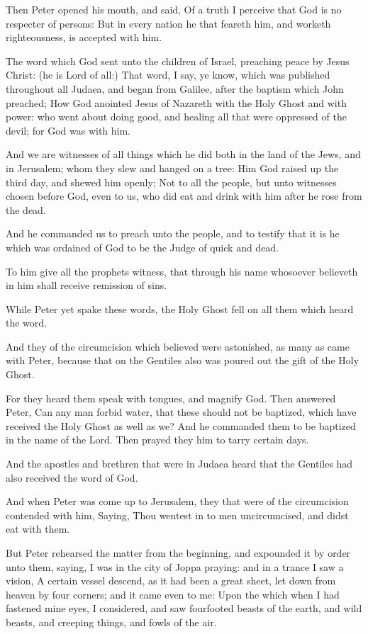 \Verse Then Peter opened his mouth, and said, Of a truth I perceive that God is no respecter of persons: \Verse But in every nation he that feareth him, and worketh righteousness, is accepted with him.

\Verse The word which God sent unto the children of Israel, preaching peace by Jesus Christ: (he is Lord of all:) \Verse That word, I say, ye know, which was published throughout all Judaea, and began from Galilee, after the baptism which John preached; \Verse How God anointed Jesus of Nazareth with the Holy Ghost and with power: who went about doing good, and healing all that were oppressed of the devil; for God was with him.

\Verse And we are witnesses of all things which he did both in the land of the Jews, and in Jerusalem; whom they slew and hanged on a tree: \Verse Him God raised up the third day, and shewed him openly; \Verse Not to all the people, but unto witnesses chosen before God, even to us, who did eat and drink with him after he rose from the dead.

\Verse And he commanded us to preach unto the people, and to testify that it is he which was ordained of God to be the Judge of quick and dead.

\Verse To him give all the prophets witness, that through his name whosoever believeth in him shall receive remission of sins.

\Verse While Peter yet spake these words, the Holy Ghost fell on all them which heard the word.

\Verse And they of the circumcision which believed were astonished, as many as came with Peter, because that on the Gentiles also was poured out the gift of the Holy Ghost.

\Verse For they heard them speak with tongues, and magnify God. Then answered Peter, \Verse Can any man forbid water, that these should not be baptized, which have received the Holy Ghost as well as we?  \Verse And he commanded them to be baptized in the name of the Lord. Then prayed they him to tarry certain days.


\Chapter
\Verse And the apostles and brethren that were in Judaea heard that the Gentiles had also received the word of God.

\Verse And when Peter was come up to Jerusalem, they that were of the circumcision contended with him, \Verse Saying, Thou wentest in to men uncircumcised, and didst eat with them.

\Verse But Peter rehearsed the matter from the beginning, and expounded it by order unto them, saying, \Verse I was in the city of Joppa praying: and in a trance I saw a vision, A certain vessel descend, as it had been a great sheet, let down from heaven by four corners; and it came even to me: \Verse Upon the which when I had fastened mine eyes, I considered, and saw fourfooted beasts of the earth, and wild beasts, and creeping things, and fowls of the air.

